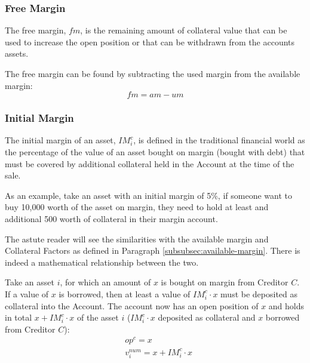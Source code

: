 \documentclass[sigconf,nonacm]{acmart}
\begin{document}
\subsubsection{Free Margin}
The free margin, $fm$, is the remaining amount of collateral value that can be used to increase the open position or that can be withdrawn from the accounts assets.

The free margin can be found by subtracting the used margin from the available margin:
\begin{equation}
    \label{eq:free-margin}
    fm = am - um
\end{equation}

\subsubsection{Initial Margin}
\label{subsubsec:initial-margin}
The initial margin of an asset, $IM_{i}^{c}$, is defined in the traditional financial world as the percentage of the value of an asset bought on margin (bought with debt)
that must be covered by additional collateral held in the Account at the time of the sale.

As an example, take an asset with an initial margin of 5\%, if someone want to buy 10,000 worth of the asset on margin,
they need to hold at least and additional 500 worth of collateral in their margin account.

The astute reader will see the similarities with the available margin and Collateral Factors as defined in Paragraph \ref{subsubsec:available-margin}.
There is indeed a mathematical relationship between the two.

Take an asset $i$, for which an amount of $x$ is bought on margin from Creditor $C$.
If a value of $x$ is borrowed, then at least a value of $IM_{i}^{c} \cdot x$ must be deposited as collateral into the Account.
The account now has an open position of $x$ and holds in total $x + IM_{i}^{c} \cdot x$ of the asset $i$ ($IM_{i}^{c} \cdot x$ deposited as collateral and $x$ borrowed from Creditor $C$):
\begin{equation}
    \label{eq:initial-margin}
    \begin{split}
        &op^c = x\\
        &v^{num}_i = x + IM_{i}^{c} \cdot x
    \end{split}
\end{equation}
\end{document}
